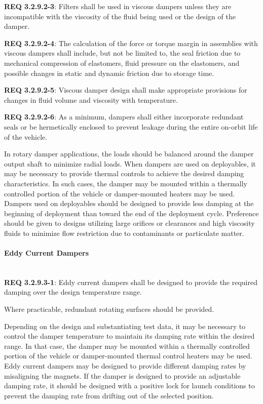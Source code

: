 \documentclass[12pt]{article}
\begin{document}
\noindent \textbf{REQ 3.2.9.2-3}: Filters shall be used in viscous dampers unless they are incompatible with the viscosity of the fluid being used or the design of the damper. 

\noindent \textbf{REQ 3.2.9.2-4}: The calculation of the force or torque margin in assemblies with viscous dampers shall include, but not be limited to, the seal friction due to mechanical compression of elastomers, fluid pressure on the elastomers, and possible changes in static and dynamic friction due to storage time. 

\noindent \textbf{REQ 3.2.9.2-5}: Viscous damper design shall make appropriate provisions for changes in fluid volume and viscosity with temperature. 

\noindent \textbf{REQ 3.2.9.2-6}: As a minimum, dampers shall either incorporate redundant seals or be hermetically enclosed to prevent leakage during the entire on-orbit life of the vehicle. 

In rotary damper applications, the loads should be balanced around the damper output shaft to minimize radial loads. 
When dampers are used on deployables, it may be necessary to provide thermal controls to achieve the desired damping characteristics. 
In such cases, the damper may be mounted within a thermally controlled portion of the vehicle or damper-mounted heaters may be used. 
Dampers used on deployables should be designed to provide less damping at the beginning of deployment than toward the end of the deployment cycle. 
Preference should be given to designs utilizing large orifices or clearances and high viscosity fluids to minimize flow restriction due to contaminants or particulate matter.


\paragraph{Eddy Current Dampers} \mbox{} \\ %
\noindent \textbf{REQ 3.2.9.3-1}: Eddy current dampers shall be designed to provide the required damping over the design temperature range. 

Where practicable, redundant rotating surfaces should be provided. 

Depending on the design and substantiating test data, it may be necessary to control the damper temperature to maintain its damping rate within the desired range. 
In that case, the damper may be mounted within a thermally controlled portion of the vehicle or damper-mounted thermal control heaters may be used. 
Eddy current dampers may be designed to provide different damping rates by misaligning the magnets. 
If the damper is designed to provide an adjustable damping rate, it should be designed with a positive lock for launch conditions to prevent the damping rate from drifting out of the selected position.
\end{document}
